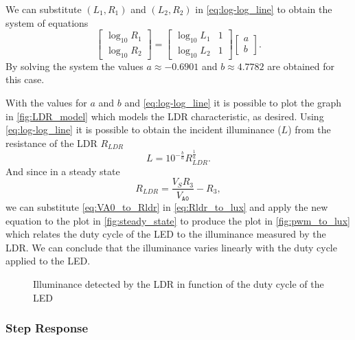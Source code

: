 We can substitute $(L_1, R_1)$ and $(L_2, R_2)$ in \eqref{eq:log-log_line} to obtain the system of equations
\begin{equation} \label{eq:log-log_line_system}
    \begin{bmatrix}
	\log_{10}R_1 \\ \log_{10}R_2
    \end{bmatrix}
    =
    \begin{bmatrix}
	\log_{10}L_1  &  1 \\
	\log_{10}L_2  &  1
    \end{bmatrix}
    \begin{bmatrix}
	a \\ b
    \end{bmatrix}.
\end{equation}
By solving the system the values $a \approx -0.6901$ and $b \approx 4.7782$ are obtained for this case.

With the values for $a$ and $b$ and \eqref{eq:log-log_line} it is possible to plot the graph in \autoref{fig:LDR_model} which models the LDR characteristic, as desired. Using \eqref{eq:log-log_line} it is possible to obtain the incident illuminance ($L$) from the resistance of the LDR $R_{LDR}$
\begin{equation} \label{eq:Rldr_to_lux}
    L = 10^{-\frac{b}{a}} R_{LDR}^{\frac{1}{a}} .
\end{equation}
And since in a steady state
\begin{equation} \label{eq:VA0_to_Rldr}
    R_{LDR} = \frac{V_S R_3}{V_{\texttt{A0}}} - R_3 ,
\end{equation}
we can substitute \eqref{eq:VA0_to_Rldr} in \eqref{eq:Rldr_to_lux} and apply the new equation to the plot in \autoref{fig:steady_state} to produce the plot in \autoref{fig:pwm_to_lux} which relates the duty cycle of the LED to the illuminance measured by the LDR. We can conclude that the illuminance varies linearly with the duty cycle applied to the LED.

\begin{figure}[h]
    \centering
    \resizebox{\textwidth}{!}{}
    \caption{Illuminance detected by the LDR in function of the duty cycle of the LED}
    \label{fig:pwm_to_lux}
\end{figure}


\subsubsection{Step Response}
\label{sub:StepResponse}

